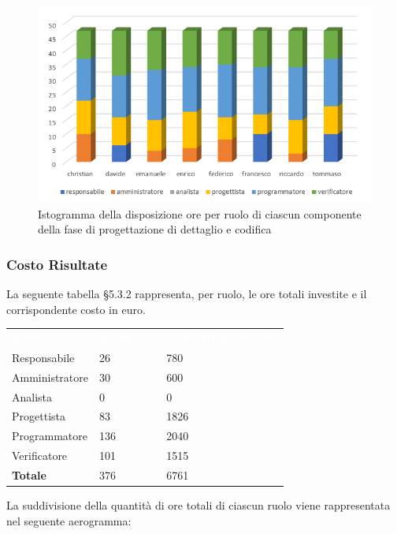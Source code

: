 \begin{figure}[h]
	\centering
	\includegraphics[scale=3]{sezioni/Istogrammi/IstogrammaDiDettaglio.png}
	\caption{Istogramma della disposizione ore per ruolo di ciascun componente della fase di progettazione di dettaglio e codifica}
\end{figure}

\subsubsection{Costo Risultate}
La seguente tabella §5.3.2 rappresenta, per ruolo, le ore totali investite e il corrispondente costo in euro.
{
	\renewcommand{\arraystretch}{2}
	\centering
	\begin{longtable}{ C{3cm} C{2cm} C{4cm}}
		\textcolor{white}{\textbf{Ruolo}} & \textcolor{white}{\textbf{Totale ore}} & \textcolor{white}{\textbf{Costo Ruolo in euro}}\\	
        
        Responsabile & 26 & 780 \\
        Amministratore & 30 & 600 \\
        Analista & 0 & 0 \\
        Progettista & 83 & 1826 \\
        Programmatore & 136 & 2040 \\
        Verificatore & 101 & 1515\\
        \textbf{Totale} & 376 & 6761 \\
		
	\end{longtable}
}

La suddivisione della quantità di ore totali di ciascun ruolo viene rappresentata nel seguente aerogramma:

